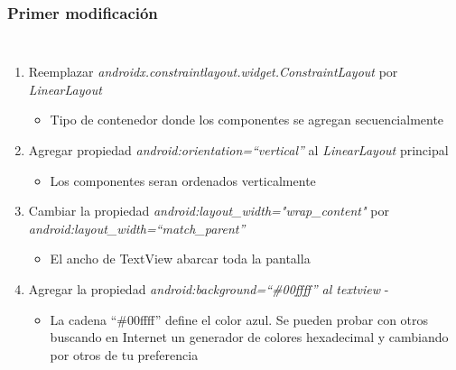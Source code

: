 \begin{frame}[fragile]
\frametitle{Primer modificaci\'on}

\begin{columns}
\begin{enumerate}
\item Reemplazar \textit{androidx.constraintlayout.widget.ConstraintLayout} por \textit{LinearLayout}
\begin{itemize}
\item Tipo de contenedor donde los componentes se agregan secuencialmente
\end{itemize}
\item Agregar propiedad \textit{android:orientation=``vertical''} al \textit{LinearLayout} principal
\begin{itemize}
\item Los componentes seran ordenados verticalmente
\end{itemize}
\item Cambiar la propiedad \textit{android:layout\_width="wrap\_content"} por \textit{android:layout\_width=``match\_parent''}
\begin{itemize}
\item El ancho de TextView abarcar toda la pantalla
\end{itemize}
\item Agregar la propiedad \textit{android:background=``\#00ffff'' al textview} - 
\begin{itemize}
\item La cadena ``\#00ffff'' define el color azul. Se pueden probar con otros buscando en Internet un generador de colores hexadecimal y cambiando por otros de tu preferencia
\end{itemize}
\end{enumerate}


\end{columns}
\end{frame}
